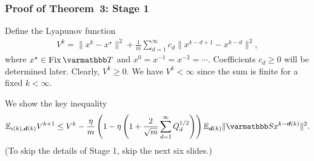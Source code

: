 \documentclass[10pt,mathserif]{beamer}
\begin{document}
\begin{frame}
\frametitle{Proof of Theorem~3: Stage 1} 
Define the Lyapunov function
\begin{align*}
  V^k = \|x^k - x^\star\|^2 + \frac{1}{m}\sum_{d=1}^{\infty}c_d \|x^{k-d+1}-x^{k-d}\|^2,
\end{align*}
where $x^\star\in\fix\opT$ and $x^{0}=x^{-1}=x^{-2}=\cdots$.
Coefficients $c_d\ge 0$ will be determined later.
Clearly, $V^k\ge 0$.
We have $V^k<\infty$ since the sum is finite for a fixed $k<\infty$.
\vspace{0.1in}

We show the key inequality
\begin{align}
  \EE_{i(k),\vecdelay(k)} V^{k+1} 
   \le V^k - \frac{\eta}{m}\left(1 - \eta\left( 1 + \frac{2}{\sqrt{m}} \sum_{d=1}^{\infty}Q_d^{1/2}\right)\right)\EE_{\vecdelay(k)}\|\opS x^{k-\vecdelay(k)}\|^2.\label{eq:asymon}
\end{align}
(To skip the details of Stage 1, skip the next six slides.)
\end{frame}




\end{document}
